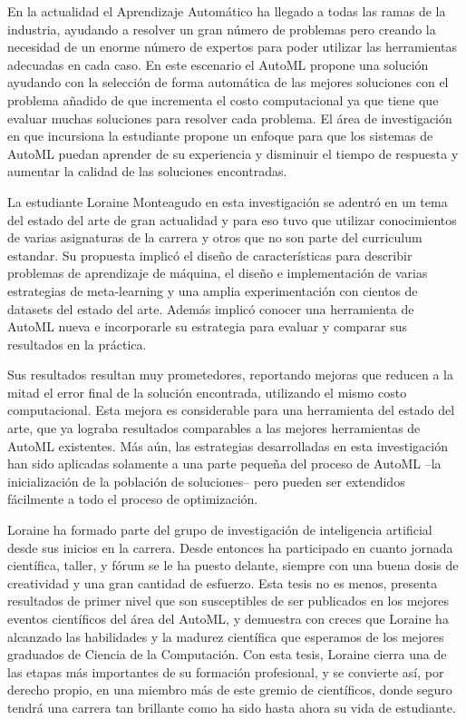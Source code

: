 \begin{opinion}


En la actualidad el Aprendizaje Automático ha llegado a todas las ramas de la industria, ayudando a resolver un gran número de problemas pero 
creando la necesidad de un enorme número de expertos para poder utilizar las herramientas adecuadas en cada caso.
En este escenario el AutoML propone una solución ayudando con la selección de forma automática de las mejores soluciones con el problema añadido de que incrementa
el costo computacional ya que tiene que evaluar muchas soluciones para resolver cada problema. %
El área de investigación en que incursiona la estudiante propone un enfoque para que los sistemas de AutoML puedan aprender de su experiencia y 
disminuir el tiempo de respuesta y aumentar la calidad de las soluciones encontradas.

La estudiante Loraine Monteagudo en esta investigación se adentró en un tema del estado del arte de gran actualidad y para eso tuvo que utilizar 
conocimientos de varias asignaturas de la carrera y otros que no son parte del curriculum estandar.
Su propuesta implicó el diseño de características para describir problemas de aprendizaje de máquina, el diseño e implementación de varias estrategias de meta-learning y 
una amplia experimentación con cientos de datasets del estado del arte.
Además implicó conocer una herramienta de AutoML nueva e incorporarle su estrategia para evaluar y comparar sus resultados en la práctica.

Sus resultados resultan muy prometedores, reportando mejoras que reducen a la mitad el error final de la solución encontrada, utilizando el mismo costo computacional.
Esta mejora es considerable para una herramienta del estado del arte, que ya lograba resultados comparables a las mejores herramientas de AutoML existentes.
Más aún, las estrategias desarrolladas en esta investigación han sido aplicadas solamente a una parte pequeña del proceso de 
AutoML --la inicialización de la población de soluciones-- pero pueden ser extendidos fácilmente a todo el proceso de optimización.

Loraine ha formado parte del grupo de investigación de inteligencia artificial desde sus inicios en la carrera.
Desde entonces ha participado en cuanto jornada científica, taller, y fórum se le ha puesto delante, siempre con una buena dosis de creatividad y una gran cantidad de esfuerzo.
Esta tesis no es menos, presenta resultados de primer nivel que son susceptibles de ser publicados en los mejores eventos científicos del área del AutoML, y demuestra con creces que Loraine ha alcanzado las habilidades y la madurez científica que esperamos de los mejores graduados de Ciencia de la Computación.
Con esta tesis, Loraine cierra una de las etapas más importantes de su formación profesional, y se convierte así, por derecho propio, en una miembro más de este gremio de científicos, donde seguro tendrá una carrera tan brillante como ha sido hasta ahora su vida de estudiante.



\end{opinion}
